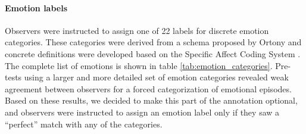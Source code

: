 \documentclass[10pt,a4paper,twocolumn]{article}
\begin{document}
\paragraph{Emotion labels}

Observers were instructed to assign one of 22 labels for discrete emotion
categories. These categories were derived from a schema proposed by
Ortony\cite{Ort1990} and concrete definitions were developed based on the
Specific Affect Coding System \cite{CG2007}. The complete list of emotions is
shown in table \ref{tab:emotion_categories}. Pre-tests using a larger and more
detailed set of emotion categories revealed weak agreement between observers
for a forced categorization of emotional episodes. Based on these results, we
decided to make this part of the annotation optional, and observers were
instructed to assign an emotion label only if they saw a ``perfect'' match with
any of the categories.
\end{document}

